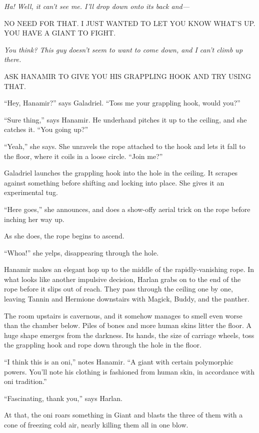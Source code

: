 \documentclass[smalldemyvopaper,11pt,twoside,onecolumn,openright,extrafontsizes]{memoir}
\newlength\drop
\begin{document}
\emph{Ha! Well, it can't see me. I'll drop down onto its back and---}

NO NEED FOR THAT. I JUST WANTED TO LET YOU KNOW WHAT'S UP. YOU HAVE A
GIANT TO FIGHT.

\emph{You think? This guy doesn't seem to want to come down, and I can't
climb up there.}

ASK HANAMIR TO GIVE YOU HIS GRAPPLING HOOK AND TRY USING THAT.

``Hey, Hanamir?'' says Galadriel. ``Toss me your grappling hook, would
you?''

``Sure thing,'' says Hanamir. He underhand pitches it up to the ceiling,
and she catches it. ``You going up?''

``Yeah,'' she says. She unravels the rope attached to the hook and lets
it fall to the floor, where it coils in a loose circle. ``Join me?''

Galadriel launches the grappling hook into the hole in the ceiling. It
scrapes against something before shifting and locking into place. She
gives it an experimental tug.

``Here goes,'' she announces, and does a show-offy aerial trick on the
rope before inching her way up.

As she does, the rope begins to ascend.

``Whoa!'' she yelps, disappearing through the hole.

Hanamir makes an elegant hop up to the middle of the rapidly-vanishing
rope. In what looks like another impulsive decision, Harlan grabs on to
the end of the rope before it slips out of reach. They pass through the
ceiling one by one, leaving Tannin and Hermione downstairs with Magick,
Buddy, and the panther.

The room upstairs is cavernous, and it somehow manages to smell even
worse than the chamber below. Piles of bones and more human skins litter
the floor. A huge shape emerges from the darkness. Its hands, the size
of carriage wheels, toss the grappling hook and rope down through the
hole in the floor.

``I think this is an oni,'' notes Hanamir. ``A giant with certain
polymorphic powers. You'll note his clothing is fashioned from human
skin, in accordance with oni tradition.''

``Fascinating, thank you,'' says Harlan.

At that, the oni roars something in Giant and blasts the three of them
with a cone of freezing cold air, nearly killing them all in one blow.
\end{document}
